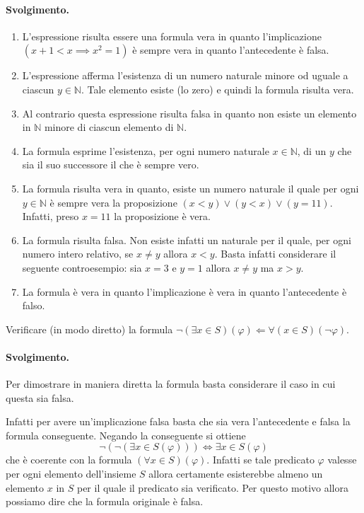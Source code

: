 \paragraph*{Svolgimento.}
\begin{enumerate}
	\item L'espressione risulta essere una formula vera in quanto l'implicazione $ (x+1 < x \implies x^{2}=1)$ è sempre vera in quanto l'antecedente è falsa.
	\item L'espressione afferma l'esistenza di un numero naturale minore od uguale a ciascun $y \in \mathbb{N}$. Tale elemento esiste (lo zero) e quindi la formula risulta vera.
	\item Al contrario questa espressione risulta falsa in quanto non esiste un elemento in $\mathbb{N}$ minore di ciascun elemento di $\mathbb{N}$.
	\item La formula esprime l'esistenza, per ogni numero naturale $x \in \mathbb{N}$, di un $y$ che sia il suo successore il che è sempre vero.
	\item La formula risulta vera in quanto, esiste un numero naturale il quale per ogni $y \in \mathbb{N}$ è sempre vera la proposizione $(x<y)\lor(y<x)\lor(y=11)$. Infatti, preso $x=11$ la proposizione è vera.
	\item La formula risulta falsa. Non esiste infatti un naturale per il quale, per ogni numero intero relativo, se $x \neq y$ allora $x < y$. Basta infatti considerare il seguente controesempio: sia $x =3$ e $y=1$ allora $x \neq y$ ma $x>y$.
	\item La formula è vera in quanto l'implicazione è vera in quanto l'antecedente è falso. \hfill \blacksquare
\end{enumerate}
\begin{exsbox}
	Verificare (in modo diretto) la formula $\neg(\exists x \in S)(\varphi) \Longleftarrow \forall(x \in S)(\neg \varphi)$.
\end{exsbox}
\paragraph*{Svolgimento.} Per dimostrare in maniera diretta la formula basta considerare il caso in cui questa sia falsa.

Infatti per avere un'implicazione falsa basta che sia vera l'antecedente e falsa la formula conseguente. Negando la conseguente si ottiene $$\neg(\neg(\exists x \in S (\varphi))) \iff \exists x \in S (\varphi)$$ che è coerente con la formula $(\forall x \in S) (\varphi)$. Infatti se tale predicato $\varphi$ valesse per ogni elemento dell'insieme $S$ allora certamente esisterebbe almeno un elemento $x$ in $S$ per il quale il predicato sia verificato. Per questo motivo allora possiamo dire che la formula originale è falsa. \hfill \blacksquare

